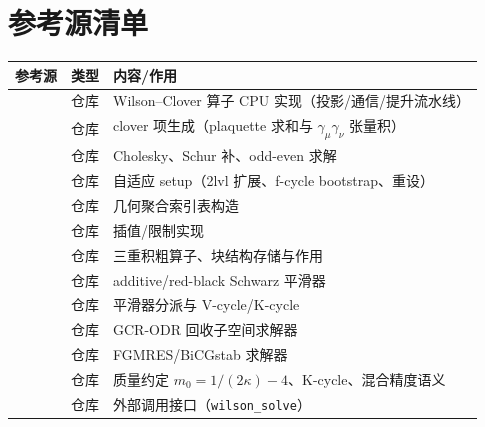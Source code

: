 \documentclass[UTF8]{ctexart}
\begin{document}
\section{参考源清单}
\begin{xltabular}{\textwidth}{llX}
\toprule
\textcolor{evidence}{参考源} & 类型 & 内容/作用 \\
\midrule
\endhead
\texttt{} & 仓库 & Wilson--Clover 算子 CPU 实现（投影/通信/提升流水线） \\
\texttt{} & 仓库 & clover 项生成（plaquette 求和与 $\gamma_\mu\gamma_\nu$ 张量积） \\
\texttt{} & 仓库 & Cholesky、Schur 补、odd-even 求解 \\
\texttt{} & 仓库 & 自适应 setup（2lvl 扩展、f-cycle bootstrap、重设） \\
\texttt{} & 仓库 & 几何聚合索引表构造 \\
\texttt{} & 仓库 & 插值/限制实现 \\
\texttt{} & 仓库 & 三重积粗算子、块结构存储与作用 \\
\texttt{} & 仓库 & additive/red-black Schwarz 平滑器 \\
\texttt{} & 仓库 & 平滑器分派与 V-cycle/K-cycle \\
\texttt{} & 仓库 & GCR-ODR 回收子空间求解器 \\
\texttt{} & 仓库 & FGMRES/BiCGstab 求解器 \\
\texttt{} & 仓库 & 质量约定 $m_0=1/(2\kappa)-4$、K-cycle、混合精度语义 \\
\texttt{} & 仓库 & 外部调用接口（\texttt{wilson\_solve}） \\
\bottomrule
\end{xltabular}

\end{document}
